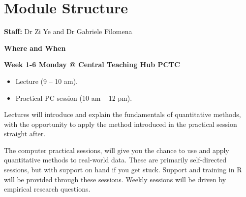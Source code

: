 \documentclass[
  letterpaper,
  DIV=11,
  numbers=noendperiod]{scrreprt}
\providecommand{\tightlist}{%
  \setlength{\itemsep}{0pt}\setlength{\parskip}{0pt}}
\begin{document}
\section*{Module Structure}\label{module-structure}


\textbf{Staff:} Dr Zi Ye and Dr Gabriele Filomena

\textbf{Where and When}

\textbf{Week 1-6 Monday @ Central Teaching Hub PCTC}

\begin{itemize}
\tightlist
\item
  Lecture (9 -- 10 am).
\item
  Practical PC session (10 am -- 12 pm).
\end{itemize}

Lectures will introduce and explain the fundamentals of quantitative
methods, with the opportunity to apply the method introduced in the
practical session straight after.

The computer practical sessions, will give you the chance to use and
apply quantitative methods to real-world data. These are primarily
self-directed sessions, but with support on hand if you get stuck.
Support and training in R will be provided through these sessions.
Weekly sessions will be driven by empirical research questions.
\end{document}
